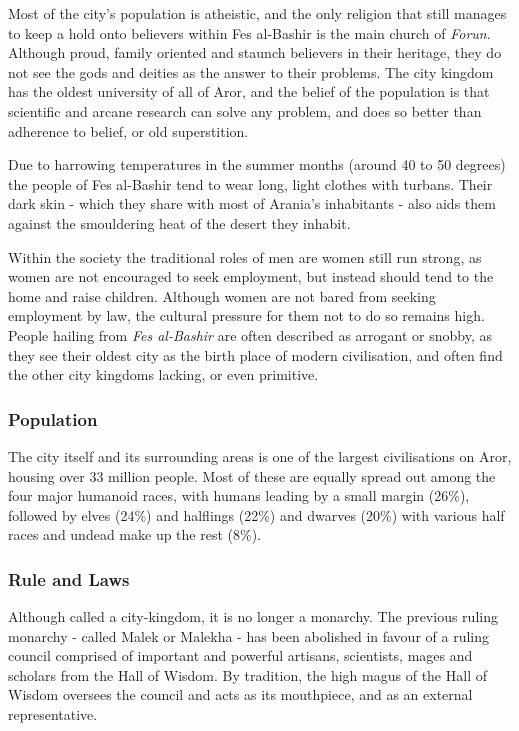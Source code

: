 Most of the city's population is atheistic, and the only religion that still
manages to keep a hold onto believers within Fes al-Bashir is the main church
of \emph{Forun}. Although proud, family oriented and staunch believers in
their heritage, they do not see the gods and deities as the answer to their
problems. The city kingdom has the oldest university of all of Aror, and the
belief of the population is that scientific and arcane research can solve any
problem, and does so better than adherence to belief, or old superstition.

Due to harrowing temperatures in the summer months (around 40 to 50 degrees)
the people of Fes al-Bashir tend to wear long, light clothes with
turbans. Their dark skin - which they share with most of Arania's inhabitants
- also aids them against the smouldering heat of the desert they inhabit.

Within the society the traditional roles of men are women still run strong, as
women are not encouraged to seek employment, but instead should tend to the
home and raise children. Although women are not bared from seeking employment
by law, the cultural pressure for them not to do so remains high. People
hailing from \emph{Fes al-Bashir} are often described as arrogant or snobby,
as they see their oldest city as the birth place of modern civilisation, and
often find the other city kingdoms lacking, or even primitive.

\subsubsection{Population}

The city itself and its surrounding areas is one of the largest civilisations
on Aror, housing over 33 million people. Most of these are equally spread out
among the four major humanoid races, with humans leading by a small margin
(26\%), followed by elves (24\%) and halflings (22\%) and dwarves (20\%) with
various half races and undead make up the rest (8\%).

\subsubsection{Rule and Laws}

Although called a city-kingdom, it is no longer a monarchy. The previous ruling
monarchy - called Malek or Malekha - has been abolished in favour of a ruling
council comprised of important and powerful artisans, scientists, mages and
scholars from the Hall of Wisdom. By tradition, the high magus of the Hall of
Wisdom oversees the council and acts as its mouthpiece, and as an external
representative.

